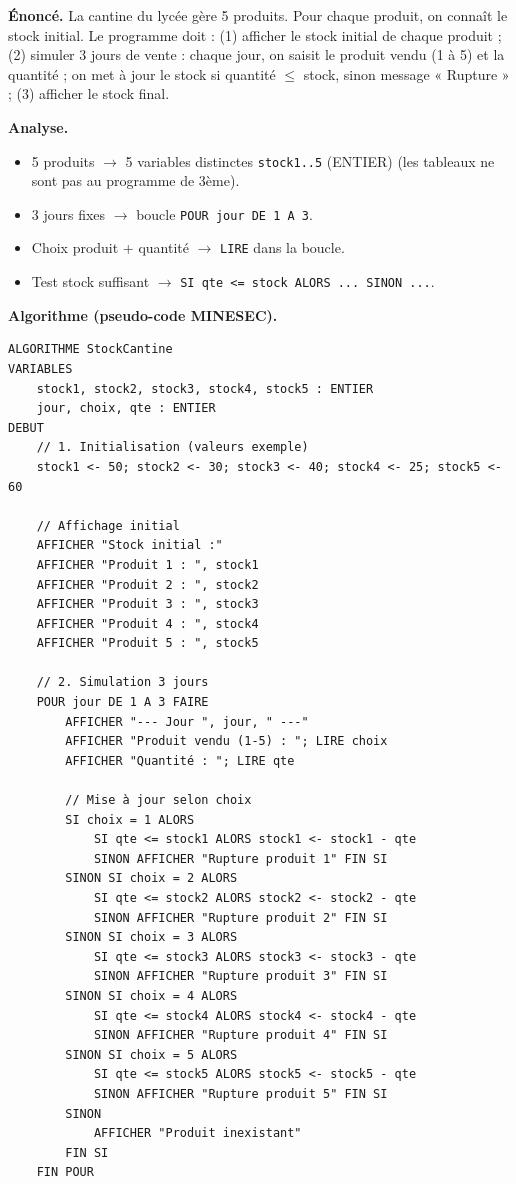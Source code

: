 \documentclass[11pt]{article}
\begin{document}
\begin{exoresolu}
\textbf{Énoncé.} La cantine du lycée gère 5 produits. Pour chaque produit, on connaît le stock initial. Le programme doit : (1) afficher le stock initial de chaque produit ; (2) simuler 3 jours de vente : chaque jour, on saisit le produit vendu (1 à 5) et la quantité ; on met à jour le stock si quantité $\le$ stock, sinon message « Rupture » ; (3) afficher le stock final.

\textbf{Analyse.}
\begin{itemize}
    \item 5 produits $\rightarrow$ 5 variables distinctes \texttt{stock1..5} (ENTIER) (les tableaux ne sont pas au programme de 3ème).
    \item 3 jours fixes $\rightarrow$ boucle \texttt{POUR jour DE 1 A 3}.
    \item Choix produit + quantité $\rightarrow$ \texttt{LIRE} dans la boucle.
    \item Test stock suffisant $\rightarrow$ \texttt{SI qte <= stock ALORS ... SINON ...}.
\end{itemize}

\textbf{Algorithme (pseudo-code MINESEC).}
\begin{lstlisting}
ALGORITHME StockCantine
VARIABLES
    stock1, stock2, stock3, stock4, stock5 : ENTIER
    jour, choix, qte : ENTIER
DEBUT
    // 1. Initialisation (valeurs exemple)
    stock1 <- 50; stock2 <- 30; stock3 <- 40; stock4 <- 25; stock5 <- 60

    // Affichage initial
    AFFICHER "Stock initial :"
    AFFICHER "Produit 1 : ", stock1
    AFFICHER "Produit 2 : ", stock2
    AFFICHER "Produit 3 : ", stock3
    AFFICHER "Produit 4 : ", stock4
    AFFICHER "Produit 5 : ", stock5

    // 2. Simulation 3 jours
    POUR jour DE 1 A 3 FAIRE
        AFFICHER "--- Jour ", jour, " ---"
        AFFICHER "Produit vendu (1-5) : "; LIRE choix
        AFFICHER "Quantité : "; LIRE qte

        // Mise à jour selon choix
        SI choix = 1 ALORS
            SI qte <= stock1 ALORS stock1 <- stock1 - qte
            SINON AFFICHER "Rupture produit 1" FIN SI
        SINON SI choix = 2 ALORS
            SI qte <= stock2 ALORS stock2 <- stock2 - qte
            SINON AFFICHER "Rupture produit 2" FIN SI
        SINON SI choix = 3 ALORS
            SI qte <= stock3 ALORS stock3 <- stock3 - qte
            SINON AFFICHER "Rupture produit 3" FIN SI
        SINON SI choix = 4 ALORS
            SI qte <= stock4 ALORS stock4 <- stock4 - qte
            SINON AFFICHER "Rupture produit 4" FIN SI
        SINON SI choix = 5 ALORS
            SI qte <= stock5 ALORS stock5 <- stock5 - qte
            SINON AFFICHER "Rupture produit 5" FIN SI
        SINON
            AFFICHER "Produit inexistant"
        FIN SI
    FIN POUR


\end{lstlisting}
\end{exoresolu}
\end{document}
